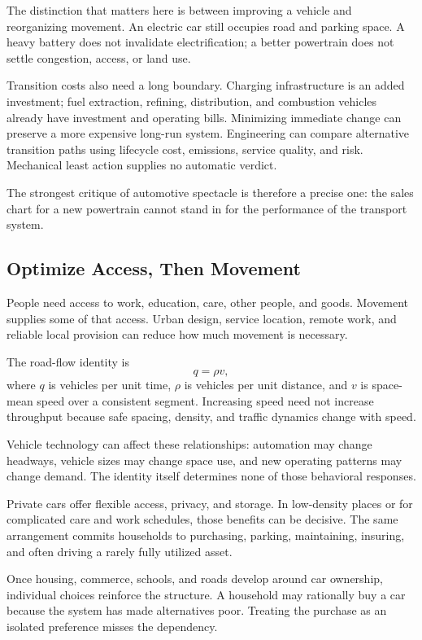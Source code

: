 \documentclass[11pt,openany]{book}
\begin{document}
The distinction that matters here is between improving a vehicle and reorganizing movement. An electric car still occupies road and parking space. A heavy battery does not invalidate electrification; a better powertrain does not settle congestion, access, or land use.

Transition costs also need a long boundary. Charging infrastructure is an added investment; fuel extraction, refining, distribution, and combustion vehicles already have investment and operating bills. Minimizing immediate change can preserve a more expensive long-run system. Engineering can compare alternative transition paths using lifecycle cost, emissions, service quality, and risk. Mechanical least action supplies no automatic verdict.

The strongest critique of automotive spectacle is therefore a precise one: the sales chart for a new powertrain cannot stand in for the performance of the transport system.

\subsection{Optimize Access, Then Movement}

People need access to work, education, care, other people, and goods. Movement supplies some of that access. Urban design, service location, remote work, and reliable local provision can reduce how much movement is necessary.

The road-flow identity is
\begin{equation}
 q=\rho v,
\end{equation}
where $q$ is vehicles per unit time, $\rho$ is vehicles per unit distance, and $v$ is space-mean speed over a consistent segment. Increasing speed need not increase throughput because safe spacing, density, and traffic dynamics change with speed.

Vehicle technology can affect these relationships: automation may change headways, vehicle sizes may change space use, and new operating patterns may change demand. The identity itself determines none of those behavioral responses.

Private cars offer flexible access, privacy, and storage. In low-density places or for complicated care and work schedules, those benefits can be decisive. The same arrangement commits households to purchasing, parking, maintaining, insuring, and often driving a rarely fully utilized asset.

Once housing, commerce, schools, and roads develop around car ownership, individual choices reinforce the structure. A household may rationally buy a car because the system has made alternatives poor. Treating the purchase as an isolated preference misses the dependency.
\end{document}
